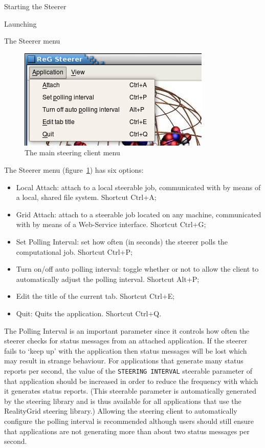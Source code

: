 \documentclass[a4paper,twoside]{article}
\begin{document}
\begin{section}{Starting the Steerer}
\begin{subsection}{Launching}
\end{subsection}


\begin{subsection}{The Steerer menu}


\begin{figure}
\centerline{\includegraphics{app_menu.png}}
\caption{The main steering client menu}
\label{fig:steerer_menu}
\end{figure}

The Steerer menu (figure~\ref{fig:steerer_menu}) has six options:
\begin{itemize}
\item Local Attach: attach to a local steerable job,
communicated with by means of a local, shared file system.
Shortcut Ctrl+A;
\item Grid Attach: attach to a steerable job located on
any machine, communicated with by means of a Web-Service
interface. Shortcut Ctrl+G;
\item Set Polling Interval: set how often (in seconds) the
steerer polls the computational job. Shortcut Ctrl+P;
\item Turn on/off auto polling interval: toggle whether or not
to allow the client to automatically adjust the polling
interval. Shortcut Alt+P;
\item Edit the title of the current tab. Shortcut Ctrl+E;
\item Quit: Quits the application. Shortcut Ctrl+Q.
\end{itemize}

The Polling Interval is an important parameter since it controls how
often the steerer checks for status messages from an attached
application.  If the steerer fails to `keep up' with the application
then status messages will be lost which may result in strange
behaviour.  For applications that generate many status reports per
second, the value of the \texttt{STEERING INTERVAL} steerable
parameter of that application should be increased in order to reduce
the frequency with which it generates status reports. (This steerable
parameter is automatically generated by the steering library and is
thus available for all applications that use the RealityGrid steering
library.)  Allowing the steering client to automatically configure the
polling interval is recommended although users should still ensure
that applications are not generating more than about two status
messages per second.


\end{subsection}
\end{section}
\end{document}
